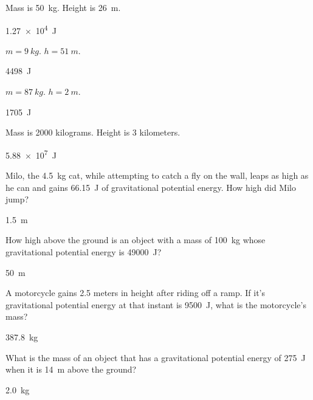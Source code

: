 \documentclass[]{exam}
\begin{document}
\begin{questions}
\begin{questions}
\question \label{NS8TFJ}
Mass is \SI{50}{kg}. Height is \SI{26}{m}.

\begin{solution}
\SI{1.27e4}{J}
\end{solution}


\question \label{29XPZj}
$m = \SI{9}{kg}$. $h = \SI{51}{m}$.

\begin{solution}
\SI{4498}{J}
\end{solution}


\question \label{Fv0opf}
$m = \SI{87}{kg}$. $h = \SI{2}{m}$.

\begin{solution}
\SI{1705}{J}
\end{solution}


\question \label{Y0v7pI}
Mass is 2000 kilograms. Height is 3 kilometers.

\begin{solution}
\SI{5.88e7}{J}
\end{solution}


\question \label{CdBjWD}
Milo, the \SI{4.5}{kg} cat, while attempting to catch a fly on the wall, leaps as high as he can and gains \SI{66.15}{J} of gravitational potential energy. How high did Milo jump?

\begin{solution}
\SI{1.5}{m}
\end{solution}


\question \label{M8oc7x}
How high above the ground is an object with a mass of \SI{100}{kg} whose gravitational potential energy is \SI{49000}{J}?

\begin{solution}
\SI{50}{m}
\end{solution}

\question \label{4S3f3k}
A motorcycle gains 2.5 meters in height after riding off a ramp. If it's gravitational potential energy at that instant is \SI{9500}{J}, what is the motorcycle's mass?

\begin{solution}
\SI{387.8}{kg}
\end{solution}

\question \label{JangCo}
What is the mass of an object that has a gravitational potential energy of \SI{275}{J} when it is \SI{14}{m} above the ground?

\begin{solution}
\SI{2.0}{kg}
\end{solution}





\end{questions}
\end{questions}
\end{document}
